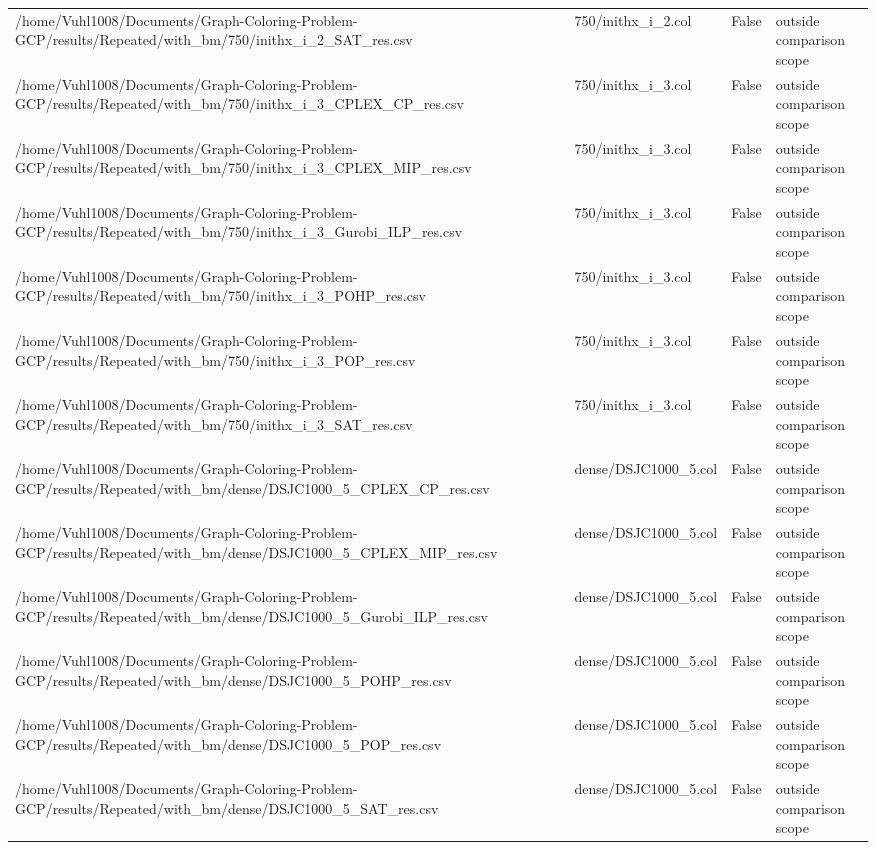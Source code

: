 \begin{table}[htbp]
\begin{tabular}{llll}
/home/Vuhl1008/Documents/Graph-Coloring-Problem-GCP/results/Repeated/with\_bm/750/inithx\_i\_2\_SAT\_res.csv & 750/inithx\_i\_2.col & False & outside comparison scope \\
/home/Vuhl1008/Documents/Graph-Coloring-Problem-GCP/results/Repeated/with\_bm/750/inithx\_i\_3\_CPLEX\_CP\_res.csv & 750/inithx\_i\_3.col & False & outside comparison scope \\
/home/Vuhl1008/Documents/Graph-Coloring-Problem-GCP/results/Repeated/with\_bm/750/inithx\_i\_3\_CPLEX\_MIP\_res.csv & 750/inithx\_i\_3.col & False & outside comparison scope \\
/home/Vuhl1008/Documents/Graph-Coloring-Problem-GCP/results/Repeated/with\_bm/750/inithx\_i\_3\_Gurobi\_ILP\_res.csv & 750/inithx\_i\_3.col & False & outside comparison scope \\
/home/Vuhl1008/Documents/Graph-Coloring-Problem-GCP/results/Repeated/with\_bm/750/inithx\_i\_3\_POHP\_res.csv & 750/inithx\_i\_3.col & False & outside comparison scope \\
/home/Vuhl1008/Documents/Graph-Coloring-Problem-GCP/results/Repeated/with\_bm/750/inithx\_i\_3\_POP\_res.csv & 750/inithx\_i\_3.col & False & outside comparison scope \\
/home/Vuhl1008/Documents/Graph-Coloring-Problem-GCP/results/Repeated/with\_bm/750/inithx\_i\_3\_SAT\_res.csv & 750/inithx\_i\_3.col & False & outside comparison scope \\
/home/Vuhl1008/Documents/Graph-Coloring-Problem-GCP/results/Repeated/with\_bm/dense/DSJC1000\_5\_CPLEX\_CP\_res.csv & dense/DSJC1000\_5.col & False & outside comparison scope \\
/home/Vuhl1008/Documents/Graph-Coloring-Problem-GCP/results/Repeated/with\_bm/dense/DSJC1000\_5\_CPLEX\_MIP\_res.csv & dense/DSJC1000\_5.col & False & outside comparison scope \\
/home/Vuhl1008/Documents/Graph-Coloring-Problem-GCP/results/Repeated/with\_bm/dense/DSJC1000\_5\_Gurobi\_ILP\_res.csv & dense/DSJC1000\_5.col & False & outside comparison scope \\
/home/Vuhl1008/Documents/Graph-Coloring-Problem-GCP/results/Repeated/with\_bm/dense/DSJC1000\_5\_POHP\_res.csv & dense/DSJC1000\_5.col & False & outside comparison scope \\
/home/Vuhl1008/Documents/Graph-Coloring-Problem-GCP/results/Repeated/with\_bm/dense/DSJC1000\_5\_POP\_res.csv & dense/DSJC1000\_5.col & False & outside comparison scope \\
/home/Vuhl1008/Documents/Graph-Coloring-Problem-GCP/results/Repeated/with\_bm/dense/DSJC1000\_5\_SAT\_res.csv & dense/DSJC1000\_5.col & False & outside comparison scope \\

\end{tabular}
\end{table}
